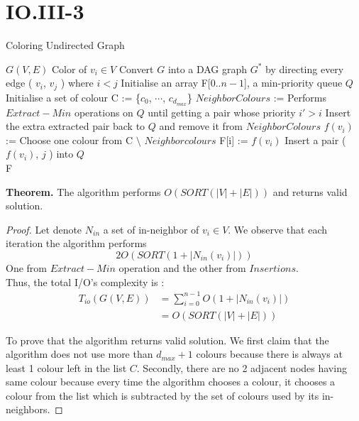 \section*{IO.III-3}

\begin{algorithm}
  \caption{Coloring Undirected Graph}
  \label{alg:global_minimum}
  \begin{algorithmic}
    \renewcommand{\algorithmicrequire}{\textbf{Input:}}
    \renewcommand{\algorithmicensure}{\textbf{Output:}}
    \algnewcommand{}
    \algnewcommand\Operation{\item[\algorithmicoperation]}
    \Require $G( V, E )$
    \Ensure Color of $v_i \in V$
    \Operation
    \State Convert $G$ into a DAG graph $G^*$ by directing every edge ( $v_i$, $v_j$ ) where $i < j$
    \State Initialise an array F[0..$n-1$], a min-priority queue $Q$
\State Initialise a set of colour C := \{$c_0$, $\cdots$, $c_{d_{max}}$\}
    	\State $NeighborColours$ := Performs $Extract-Min$ operations on $Q$ until getting a pair whose priority $i' > i$
	\State Insert the extra extracted pair back to $Q$ and remove it from $NeighborColours$
	\State $f(v_i)$ := Choose one colour from C $\setminus$ $Neighborcolours$
	\State F[i] := $f(v_i)$
	        \State Insert a pair ( $f(v_i)$, $j$ ) into $Q$
	   \EndFor
    \EndFor \\
    \Return F
  \end{algorithmic}
\end{algorithm}
\textbf{Theorem.} The algorithm performs $O( SORT(|V|+|E|) )$ and returns valid solution.

\begin{proof}
    Let denote $N_{in}$ a set of in-neighbor of $v_i \in V$. We observe that each iteration the algorithm performs
    $$2O( SORT(1 + |N_{in}(v_i)| ))$$
One from $Extract-Min$ operation and the other from $Insertions$. \\
Thus, the total I/O's complexity  is :
\begin{align*}
    T_{io}(G(V,E)) &= \sum^{n-1}_{i=0}{O( 1 + |N_{in}(v_i)|)} \\
    &= O( SORT( |V|+|E| ))
\end{align*}

To prove that the algorithm returns valid solution. We first claim that the algorithm does not use more than $d_{max} + 1 $ colours because
there is always at least 1 colour left in the list $C$. Secondly, there are no 2 adjacent nodes having same colour
because every time the algorithm chooses a colour, it chooses a colour from the list which is subtracted by the set of colours used by its in-neighbors.

\end{proof}
